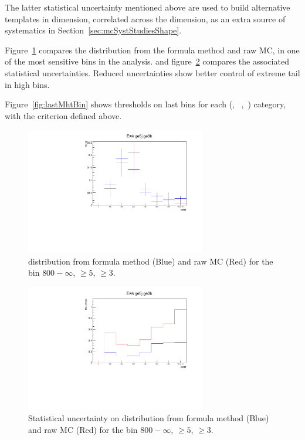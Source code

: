 The latter statistical uncertainty mentioned above are used to 
build alternative templates in \mht dimension, correlated across the \nb dimension, 
as an extra source of systematics in Section~\ref{sec:mcSystStudiesShape}.

Figure~\ref{fig:mhtShape_ge5j_ge3b_ht800} compares the \mht distribution from
the formula method and raw MC, in one of the most sensitive bins in the analysis.
 and figure~\ref{fig:mhtShapeErr_ge5j_ge3b_ht800} compares the associated 
 statistical uncertainties. Reduced uncertainties show better control 
  of extreme \mht tail in high \nb bins.

Figure~\ref{fig:lastMhtBin} shows thresholds on last \mht bins for each (\njet,
~\nb,~\scalht) category, with the criterion defined above.


\begin{figure}[h!]
  \centering
  \includegraphics[width=0.7\textwidth]{figures/btagformula/GoodMHTShape_ge5j_ge3b.pdf} 
  \caption{\label{fig:mhtShape_ge5j_ge3b_ht800} \mht distribution from formula
   method (Blue) and raw MC (Red) for the bin \scalht $800-\infty$, \njet $\geq 5$, \nb $\geq 3$.}
\end{figure}

\begin{figure}[h!]
  \centering
  \includegraphics[width=0.7\textwidth]{figures/btagformula/GoodMHTShapeErr_ge5j_ge3b.pdf} 
  \caption{\label{fig:mhtShapeErr_ge5j_ge3b_ht800} Statistical uncertainty on \mht 
  distribution from formula method (Blue) and raw MC (Red) for the bin
  \scalht $800-\infty$, \njet $\geq 5$, \nb $\geq 3$.}
\end{figure}

